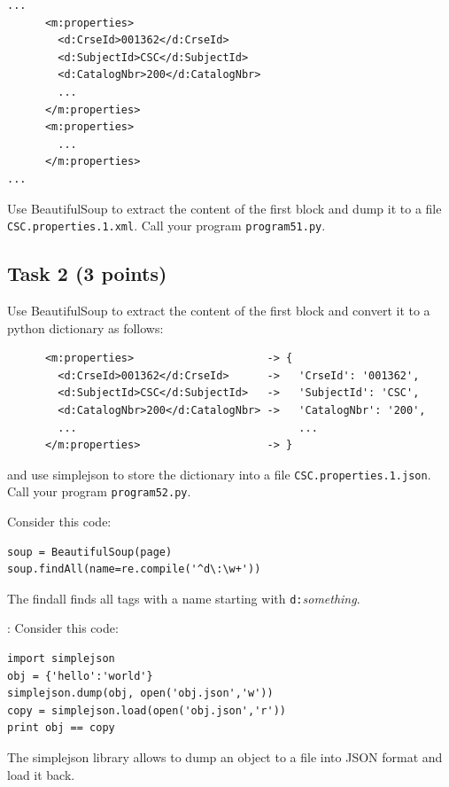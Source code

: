 \documentclass[12pt]{article}
\begin{document}
\begin{verbatim}
...
      <m:properties>
        <d:CrseId>001362</d:CrseId>
        <d:SubjectId>CSC</d:SubjectId>
        <d:CatalogNbr>200</d:CatalogNbr>
        ...
      </m:properties>
      <m:properties>
        ...
      </m:properties>
...
\end{verbatim}

\noindent Use BeautifulSoup to extract the content of the first {\tt <m:properties>} block and dump it to a file {\tt CSC.properties.1.xml}. Call your program {\tt program51.py}.

\subsection{Task 2 (3 points)}

\noindent Use BeautifulSoup to extract the content of the first {\tt <m:properties>} block and convert it to a python dictionary as follows:

\begin{verbatim}
      <m:properties>                     -> {
        <d:CrseId>001362</d:CrseId>      ->   'CrseId': '001362',
        <d:SubjectId>CSC</d:SubjectId>   ->   'SubjectId': 'CSC',
        <d:CatalogNbr>200</d:CatalogNbr> ->   'CatalogNbr': '200',
        ...                                   ...
      </m:properties>                    -> }
\end{verbatim}

\noindent and use simplejson to store the dictionary into a file {\tt CSC.properties.1.json}. Call your program {\tt program52.py}.

 Consider this code:
\begin{verbatim}
soup = BeautifulSoup(page)
soup.findAll(name=re.compile('^d\:\w+'))
\end{verbatim}

\noindent The findall finds all tags with a name starting with {\tt d:}{\it something}.

: Consider this code:

\begin{verbatim}
import simplejson
obj = {'hello':'world'}
simplejson.dump(obj, open('obj.json','w'))
copy = simplejson.load(open('obj.json','r'))
print obj == copy
\end{verbatim}

\noindent The simplejson library allows to dump an object to a file into JSON format and load it back.
\end{document}
